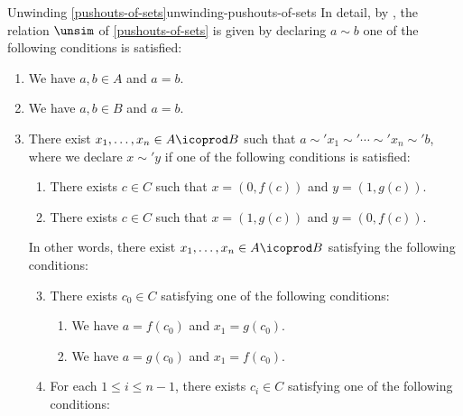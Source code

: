 \begin{remark}{Unwinding \cref{pushouts-of-sets}}{unwinding-pushouts-of-sets}%
    In detail, by , the relation $\unsim$ of \cref{pushouts-of-sets} is given by declaring $a\sim b$ \textiff one of the following conditions is satisfied:%
    \begin{enumerate}
        \item\label{unwinding-pushouts-of-sets-1}We have $a,b\in A$ and $a=b$.
        \item\label{unwinding-pushouts-of-sets-2}We have $a,b\in B$ and $a=b$.
        \item\label{unwinding-pushouts-of-sets-3}There exist $x_{1},\ldots,x_{n}\in A\icoprod B$ such that $a\sim'x_{1}\sim'\cdots\sim'x_{n}\sim'b$, where we declare $x\sim'y$ if one of the following conditions is satisfied:
            \begin{enumerate}
                \item\label{unwinding-pushouts-of-sets-3-a}There exists $c\in C$ such that $x=(0,f(c))$ and $y=(1,g(c))$.
                \item\label{unwinding-pushouts-of-sets-3-b}There exists $c\in C$ such that $x=(1,g(c))$ and $y=(0,f(c))$.
            \end{enumerate}
            In other words, there exist $x_{1},\ldots,x_{n}\in A\icoprod B$ satisfying the following conditions:
            \begin{enumerate}
                \setcounter{enumii}{2}
                \item\label{unwinding-pushouts-of-sets-3-c}There exists $c_{0}\in C$ satisfying one of the following conditions:
                    \begin{enumerate}
                        \item\label{unwinding-pushouts-of-sets-3-c-i}We have $a=f(c_{0})$ and $x_{1}=g(c_{0})$.
                        \item\label{unwinding-pushouts-of-sets-3-c-ii}We have $a=g(c_{0})$ and $x_{1}=f(c_{0})$.
                    \end{enumerate}
                \item\label{unwinding-pushouts-of-sets-3-d}For each $1\leq i\leq n-1$, there exists $c_{i}\in C$ satisfying one of the following conditions:
                    \begin{enumerate}

\end{enumerate}
\end{enumerate}
\end{enumerate}
\end{remark}
